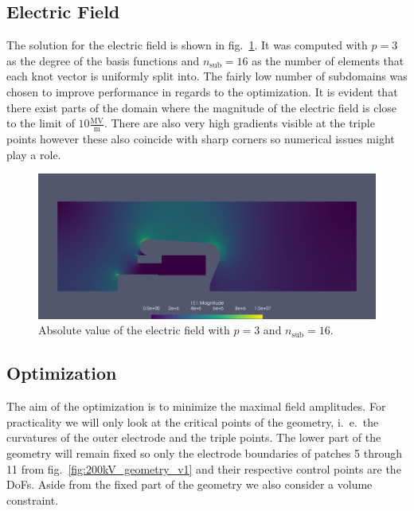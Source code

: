 \subsection{Electric Field}
The solution for the electric field is shown in fig.~\ref{fig:200kV_electric_field}.
It was computed with $p=3$ as the degree of the basis functions and $n_\mathrm{sub}=16$ as the number of elements that each knot vector is uniformly split into. The fairly low number of subdomains was chosen to improve performance in regards to the optimization.
It is evident that there exist parts of the domain where the magnitude of the electric field is close to the limit of $10 \frac{\mathrm{MV}}{\mathrm{m}}$. There are also very high gradients visible at the triple points however these also coincide with sharp corners so numerical issues might play a role.

\begin{center}
\begin{figure}[H]
  \includegraphics[width=\textwidth]{figures/200kV/png/order=3}
  \caption{Absolute value of the electric field with $p=3$ and $n_\mathrm{sub}=16$.}
  \label{fig:200kV_electric_field}
\end{figure}
\end{center}

\subsection{Optimization}
The aim of the optimization is to minimize the maximal field amplitudes. For practicality we will only look at the critical points of the geometry, i.~e.~the curvatures of the outer electrode and the triple points. The lower part of the geometry will remain fixed so only the electrode boundaries of patches 5 through 11 from fig.~\ref{fig:200kV_geometry_v1} and their respective control points are the DoFs. Aside from the fixed part of the geometry we also consider a volume constraint.

